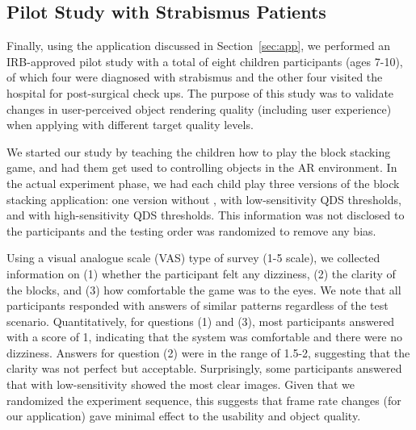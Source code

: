 \subsection{Pilot Study with Strabismus Patients}
\label{sec:pilot-study}

Finally, using the application discussed in Section~\ref{sec:app}, we performed 
an IRB-approved pilot study with a total of eight children participants 
(ages 7-10), of which four were diagnosed with strabismus and the other four 
visited the hospital for post-surgical check ups.
%
The purpose of this study was to validate changes in user-perceived object
rendering quality (including user experience) when applying {\myit} with different target quality levels.
%


We started our study by teaching the children how to play the block stacking 
game, and had them get used to controlling objects in the AR environment.
%
In the actual experiment phase, we had each child play three versions of the
block stacking application: one version without {\myit}, {\myit} with 
low-sensitivity QDS thresholds, and {\myit} with high-sensitivity QDS thresholds.
%
This information was not disclosed to the participants and the testing order was
randomized to remove any bias.


%
Using a visual analogue scale (VAS) type of survey (1-5 scale), we collected 
information on (1) whether the participant felt any dizziness, (2) the clarity 
of the blocks, and (3) how comfortable the game was to the eyes.
%
We note that all participants responded with answers of similar patterns
regardless of the test scenario.
%
Quantitatively, for questions (1) and (3), most participants answered with 
a score of 1, indicating that the system was comfortable and there were no 
dizziness. Answers for question (2) were in the range of 1.5-2, suggesting that
the clarity was not perfect but acceptable. Surprisingly, some participants 
answered that {\myit} with low-sensitivity showed the most clear images.
Given that we randomized the experiment sequence, this suggests that frame 
rate changes (for our application) gave minimal effect to the
usability and object quality.






